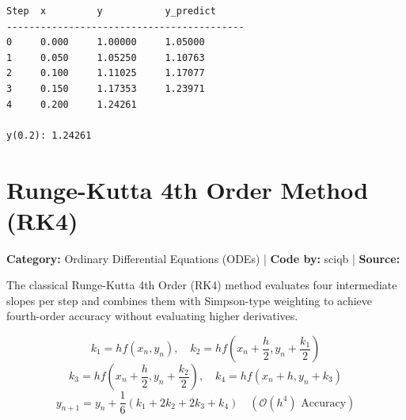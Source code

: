 \documentclass[10pt,a4paper]{report}
\begin{document}
\begin{tcolorbox}[colback=termbg,colframe=primary,title=\textbf{Program Execution Output \& Convergence Table},boxrule=1pt,arc=2mm]
\begin{lstlisting}[style=terminal_output]
Step  x         y           y_predict     
------------------------------------------
0     0.000     1.00000     1.05000       
1     0.050     1.05250     1.10763       
2     0.100     1.11025     1.17077       
3     0.150     1.17353     1.23971       
4     0.200     1.24261     

y(0.2): 1.24261
\end{lstlisting}
\end{tcolorbox}

\newpage


\section{Runge-Kutta 4th Order Method (RK4)}
\textbf{Category:} \textcolor{secondary}{Ordinary Differential Equations (ODEs)} \quad | \quad \textbf{Code by:} \textcolor{secondary}{sciqb} \quad | \quad \textbf{Source:} \texttt{}

The classical Runge-Kutta 4th Order (RK4) method evaluates four intermediate slopes per step and combines them with Simpson-type weighting to achieve fourth-order accuracy without evaluating higher derivatives.

\begin{tcolorbox}[colback=theorybg,colframe=theoryframe,title=\textbf{Mathematical Theory \& Formulation},boxrule=1pt,arc=2mm]
\[
k_1 = h f(x_n, y_n), \quad k_2 = h f\left(x_n + \frac{h}{2}, y_n + \frac{k_1}{2}\right)
\]
\[
k_3 = h f\left(x_n + \frac{h}{2}, y_n + \frac{k_2}{2}\right), \quad k_4 = h f(x_n + h, y_n + k_3)
\]
\[
y_{n+1} = y_n + \frac{1}{6}(k_1 + 2k_2 + 2k_3 + k_4) \quad (\mathcal{O}(h^4) \text{ Accuracy})
\]
\end{tcolorbox}
\end{document}

